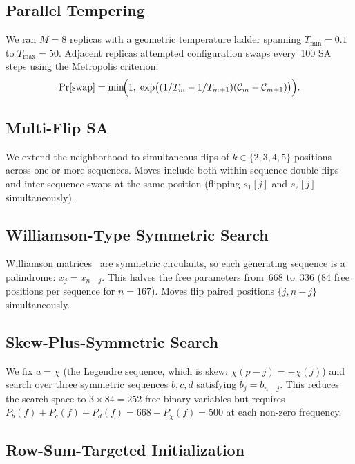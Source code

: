 \documentclass[11pt,a4paper]{article}
\begin{document}
\subsection{Parallel Tempering}\label{sec:method:pt}

We ran $M = 8$ replicas with a geometric temperature ladder spanning
$T_{\min} = 0.1$ to $T_{\max} = 50$.  Adjacent replicas attempted
configuration swaps every~100 SA steps using the Metropolis criterion:
\[
  \Pr[\text{swap}] = \min\!\Bigl(1,\;
    \exp\bigl((1/T_m - 1/T_{m+1})(\mathcal{C}_m - \mathcal{C}_{m+1})\bigr)\Bigr).
\]

\subsection{Multi-Flip SA}\label{sec:method:multiflip}

We extend the neighborhood to simultaneous flips of $k \in \{2,3,4,5\}$
positions across one or more sequences.  Moves include both
within-sequence double flips and inter-sequence swaps at the same position
(flipping $s_1[j]$ and $s_2[j]$ simultaneously).

\subsection{Williamson-Type Symmetric Search}\label{sec:method:williamson}

Williamson matrices~\cite{williamson1944hadamard} are symmetric circulants,
so each generating sequence is a palindrome: $x_j = x_{n-j}$.  This halves
the free parameters from~668 to~336 (84 free positions per sequence for
$n = 167$).  Moves flip paired positions $\{j, n-j\}$ simultaneously.

\subsection{Skew-Plus-Symmetric Search}\label{sec:method:skewsym}

We fix $a = \chi$ (the Legendre sequence, which is skew: $\chi(p-j) =
-\chi(j)$) and search over three symmetric sequences $b, c, d$ satisfying
$b_j = b_{n-j}$.  This reduces the search space to $3 \times 84 = 252$
free binary variables but requires $P_b(f) + P_c(f) + P_d(f) = 668 -
P_\chi(f) = 500$ at each non-zero frequency.

\subsection{Row-Sum-Targeted Initialization}\label{sec:method:rowsum}
\end{document}
